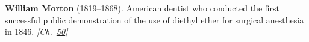 \textbf{William Morton} (1819–1868). American dentist who conducted the first successful public demonstration of the use of diethyl ether for surgical anesthesia in 1846. \emph{[Ch.~\hyperref[ch:consciousness]{50}]}

